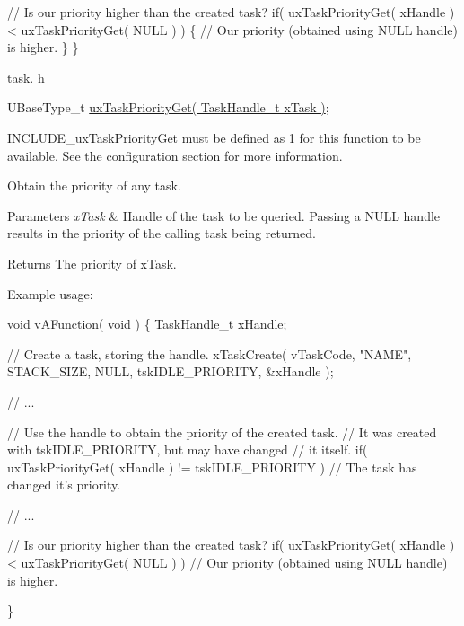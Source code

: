 \begin{DoxyPre}  // Is our priority higher than the created task?
  if( uxTaskPriorityGet( xHandle ) < uxTaskPriorityGet( NULL ) )
  \{
      // Our priority (obtained using NULL handle) is higher.
  \}
\}
\end{DoxyPre}


task. h 
\begin{DoxyPre}UBaseType\_t \hyperlink{externals_2freertos_2include_2task_8h_a18d1148c845f5c4bff3b9e5b2077e058}{uxTaskPriorityGet( TaskHandle\_t xTask )};\end{DoxyPre}


I\+N\+C\+L\+U\+D\+E\+\_\+ux\+Task\+Priority\+Get must be defined as 1 for this function to be available. See the configuration section for more information.

Obtain the priority of any task.


\begin{DoxyParams}{Parameters}
{\em x\+Task} & Handle of the task to be queried. Passing a N\+U\+LL handle results in the priority of the calling task being returned.\\
\hline
\end{DoxyParams}
\begin{DoxyReturn}{Returns}
The priority of x\+Task.
\end{DoxyReturn}
Example usage\+: 
\begin{DoxyPre}
void vAFunction( void )
\{
TaskHandle\_t xHandle;
\begin{DoxyVerb}// Create a task, storing the handle.
xTaskCreate( vTaskCode, "NAME", STACK_SIZE, NULL, tskIDLE_PRIORITY, &xHandle );

// ...

// Use the handle to obtain the priority of the created task.
// It was created with tskIDLE_PRIORITY, but may have changed
// it itself.
if( uxTaskPriorityGet( xHandle ) != tskIDLE_PRIORITY )
{
 // The task has changed it's priority.
}

// ...

// Is our priority higher than the created task?
if( uxTaskPriorityGet( xHandle ) < uxTaskPriorityGet( NULL ) )
{
 // Our priority (obtained using NULL handle) is higher.
}
\end{DoxyVerb}

\}
  \end{DoxyPre}
 